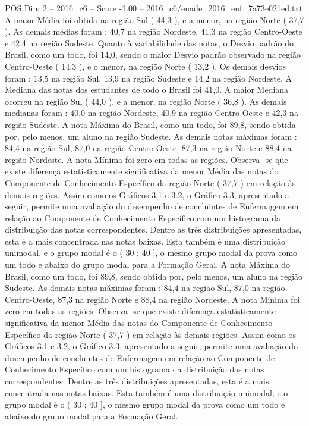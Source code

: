 \begin{textsample}{POS Dim 2 – 2016\_c6 – Score -1.00 – 2016\_c6/enade\_2016\_enf\_7a73e021ed.txt}
A maior Média foi obtida na região Sul ( 44,3 ), e a menor, na região Norte ( 37,7 ).
As demais médias foram : 40,7 na região Nordeste, 41,3 na região Centro-Oeste e 42,4 na região Sudeste.
Quanto à variabilidade das notas, o Desvio padrão do Brasil, como um todo, foi 14,0, sendo o maior Desvio padrão observado na região Centro-Oeste ( 14,3 ), e o menor, na região Norte ( 13,2 ).
Os demais desvios foram : 13,5 na região Sul, 13,9 na região Sudeste e 14,2 na região Nordeste.
A Mediana das notas dos estudantes de todo o Brasil foi 41,0.
A maior Mediana ocorreu na região Sul ( 44,0 ), e a menor, na região Norte ( 36,8 ).
As demais medianas foram : 40,0 na região Nordeste, 40,9 na região Centro-Oeste e 42,3 na região Sudeste.
A nota Máxima do Brasil, como um todo, foi 89,8, sendo obtida por, pelo menos, um aluno na região Sudeste.
As demais notas máximas foram : 84,4 na região Sul, 87,0 na região Centro-Oeste, 87,3 na região Norte e 88,4 na região Nordeste.
A nota Mínima foi zero em todas as regiões.
Observa -se que existe diferença estatisticamente significativa da menor Média das notas do Componente de Conhecimento Específico da região Norte ( 37,7 ) em relação às demais regiões.
Assim como os Gráficos 3.1 e 3.2, o Gráfico 3.3, apresentado a seguir, permite uma avaliação do desempenho de concluintes de Enfermagem em relação ao Componente de Conhecimento Específico com um histograma da distribuição das notas correspondentes.
Dentre as três distribuições apresentadas, esta é a mais concentrada nas notas baixas.
Esta também é uma distribuição unimodal, e o grupo modal é o ( 30 ; 40 ], o mesmo grupo modal da prova como um todo e abaixo do grupo modal para a Formação Geral.
A nota Máxima do Brasil, como um todo, foi 89,8, sendo obtida por, pelo menos, um aluno na região Sudeste.
As demais notas máximas foram : 84,4 na região Sul, 87,0 na região Centro-Oeste, 87,3 na região Norte e 88,4 na região Nordeste.
A nota Mínima foi zero em todas as regiões.
Observa -se que existe diferença estatisticamente significativa da menor Média das notas do Componente de Conhecimento Específico da região Norte ( 37,7 ) em relação às demais regiões.
Assim como os Gráficos 3.1 e 3.2, o Gráfico 3.3, apresentado a seguir, permite uma avaliação do desempenho de concluintes de Enfermagem em relação ao Componente de Conhecimento Específico com um histograma da distribuição das notas correspondentes.
Dentre as três distribuições apresentadas, esta é a mais concentrada nas notas baixas.
Esta também é uma distribuição unimodal, e o grupo modal é o ( 30 ; 40 ], o mesmo grupo modal da prova como um todo e abaixo do grupo modal para a Formação Geral.

\end{textsample}
